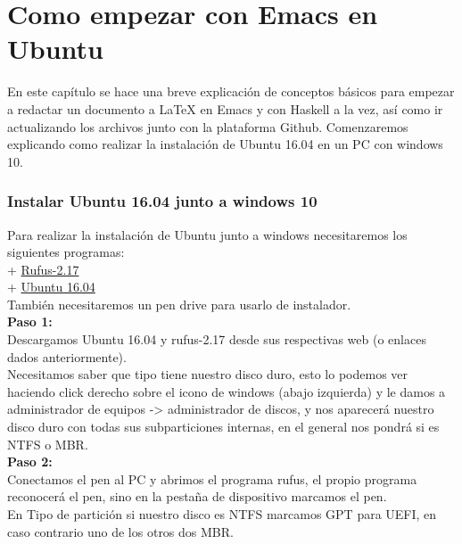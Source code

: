 \chapter{Como empezar con Emacs en Ubuntu}\label{sec:InCapHas}

En este capítulo se hace una breve explicación de conceptos básicos para empezar a redactar un documento a LaTeX en Emacs y con Haskell a la vez, así como ir actualizando los archivos junto con la plataforma Github. Comenzaremos explicando como realizar la instalación de Ubuntu 16.04 en un PC con windows 10.\\

\subsection{Instalar Ubuntu 16.04 junto a windows 10}

Para realizar la instalación de Ubuntu junto a windows necesitaremos los siguientes programas:\\

+ \href{https://rufus.akeo.ie/?locale=es_ES}{Rufus-2.17}\\

+ \href{https://www.ubuntu.com/download/desktop}{Ubuntu 16.04}\\

También necesitaremos un pen drive para usarlo de instalador.\\

\textbf{Paso 1:}\\
Descargamos Ubuntu 16.04 y rufus-2.17 desde sus respectivas web (o enlaces dados anteriormente).\\
Necesitamos saber que tipo tiene nuestro disco duro, esto lo podemos ver haciendo click derecho sobre el icono de windows (abajo izquierda) y le damos a administrador de equipos -> administrador de discos, y nos aparecerá nuestro disco duro con todas sus subparticiones internas, en el general nos pondrá si es NTFS o MBR.\\

\textbf{Paso 2:}\\
Conectamos el pen al PC y abrimos el programa rufus, el propio programa reconocerá el pen, sino en la pestaña de dispositivo marcamos el pen.\\

En Tipo de partición si nuestro disco es NTFS marcamos GPT para UEFI, en caso contrario uno de los otros dos MBR.\\

